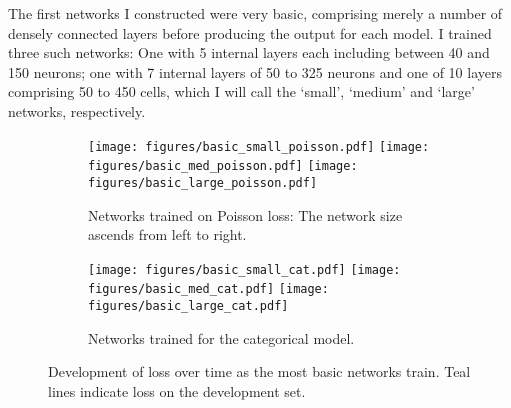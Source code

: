 \documentclass[10pt, twoside, a4paper]{article}
\begin{document}
%

	The first networks I constructed were very basic, comprising merely 
	a number of densely connected layers before producing the output for each model. I trained 
	three such networks: One with 5 internal 
	layers each including between 40 and 150 neurons; one with 7 internal layers of 50 to 325
	neurons and one of 10 layers comprising 50 to 450 cells, which I will call the `small', 
	`medium' and `large' networks, respectively. 

	\begin{figure}
	\begin{center}
	\begin{subfigure}[b]{17cm}
	\texttt{[image: figures/basic\_small\_poisson.pdf]}
	\texttt{[image: figures/basic\_med\_poisson.pdf]}
	\texttt{[image: figures/basic\_large\_poisson.pdf]}
	\caption{Networks trained on Poisson loss: The network size ascends from left to right.}
	\end{subfigure}
	\begin{subfigure}[b]{17cm}
	\texttt{[image: figures/basic\_small\_cat.pdf]}
	\texttt{[image: figures/basic\_med\_cat.pdf]}
	\texttt{[image: figures/basic\_large\_cat.pdf]}
	\caption{Networks trained for the categorical model.}
	\end{subfigure}
	\end{center}
	\caption{Development of loss over time as the most basic networks train.  Teal lines indicate loss on the development set.}
	\label{fig:mlpmeasure}
	\end{figure}
\end{document}
